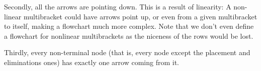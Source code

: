 {    Secondly, all the arrows are pointing down. This is a result of linearity: A non-linear multibracket could have arrows point up, or even from a given multibracket to itself, making a flowchart much more complex. Note that we don't even define a flowchart for nonlinear multibrackets as the niceness of the rows would be lost.
    
    Thirdly, every non-terminal node (that is, every node except the placement and eliminations ones) has exactly one arrow coming from it. 




}